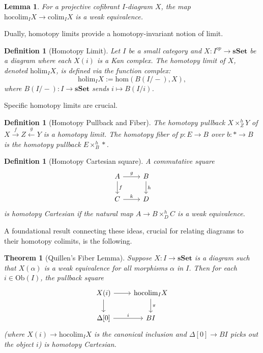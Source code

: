 \documentclass[12pt]{report}
\numberwithin{equation}{section}
\newtheorem{theorem}[dummy]{Theorem}
\newtheorem{definition}[dummy]{Definition}
\newtheorem{lemma}[dummy]{Lemma}
\begin{document}
	\begin{lemma}\label{lem:hocolim_vs_colim_condensed}
		For a projective cofibrant $I$-diagram $X$, the map $\mathrm{hocolim}_{I} X \to \mathrm{colim}_{I} X$ is a weak equivalence.
	\end{lemma}
	
	Dually, homotopy limits provide a homotopy-invariant notion of limit.
	
	\begin{definition}[Homotopy Limit]
		Let $I$ be a small category and $X: I^{op} \to \mathbf{sSet}$ be a diagram where each $X(i)$ is a Kan complex. The homotopy limit of $X$, denoted $\mathrm{holim}_{I} X$, is defined via the function complex:
		\[ \mathrm{holim}_{I} X := \mathrm{hom}(B(I/-), X), \]
		where $B(I/-): I \to \mathbf{sSet}$ sends $i \mapsto B(I/i)$.
	\end{definition}
	
	Specific homotopy limits are crucial.
	
	\begin{definition}[Homotopy Pullback and Fiber]
		The homotopy pullback $X \times^h_Z Y$ of $X \xrightarrow{f} Z \xleftarrow{g} Y$ is a homotopy limit. The homotopy fiber of $p: E \to B$ over $b: * \to B$ is the homotopy pullback $E \times^h_B *$.
	\end{definition}
	
	\begin{definition}[Homotopy Cartesian square]
		A commutative square
		\[
		\begin{tikzcd}
			A \arrow{r}{g} \arrow{d}{f} & B \arrow{d}{h} \\
			C \arrow{r}{k} & D
		\end{tikzcd}
		\]
		is homotopy Cartesian if the natural map $A \to B \times^h_D C$ is a weak equivalence.
	\end{definition}
	
	A foundational result connecting these ideas, crucial for relating diagrams to their homotopy colimits, is the following.	
	
	\begin{theorem}[Quillen's Fiber Lemma]\label{thm:quillen_fiber_lemma_condensed}
		Suppose $X: I \to \mathbf{sSet}$ is a diagram such that $X(\alpha)$ is a weak equivalence for all morphisms $\alpha$ in $I$. Then for each $i \in \mathrm{Ob}(I)$, the pullback square
		\[
		\begin{tikzcd}
			X(i) \arrow{r} \arrow{d} & \mathrm{hocolim}_{I} X \arrow{d}{\pi} \\
			\Delta[0] \arrow{r}{i} & BI
		\end{tikzcd}
		\]
		(where $X(i) \to \mathrm{hocolim}_I X$ is the canonical inclusion and $\Delta[0] \to BI$ picks out the object $i$) is homotopy Cartesian.
	\end{theorem}
	
\end{document}
